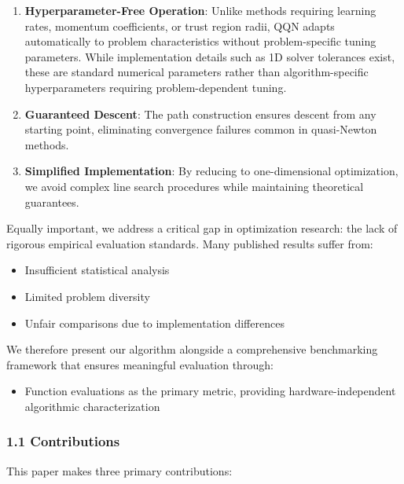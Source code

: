 \begin{enumerate}
\def\labelenumi{\arabic{enumi}.}
\item
  \textbf{Hyperparameter-Free Operation}: Unlike methods requiring learning rates, momentum coefficients, or trust region
  radii, QQN adapts automatically to problem characteristics without problem-specific tuning parameters. While
  implementation details such as 1D solver tolerances exist, these are standard numerical parameters rather than
  algorithm-specific hyperparameters requiring problem-dependent tuning.
\item
  \textbf{Guaranteed Descent}: The path construction ensures descent from any starting point, eliminating convergence
  failures common in quasi-Newton methods.
\item
  \textbf{Simplified Implementation}: By reducing to one-dimensional optimization, we avoid complex line search procedures
  while maintaining theoretical guarantees.
\end{enumerate}

Equally important, we address a critical gap in optimization research: the lack of rigorous empirical evaluation
standards. Many published results suffer from:

\begin{itemize}
\tightlist
\item
  Insufficient statistical analysis
\item
  Limited problem diversity
\item
  Unfair comparisons due to implementation differences
\end{itemize}

We therefore present our algorithm alongside a comprehensive benchmarking framework that ensures meaningful evaluation
through:

\begin{itemize}
\tightlist
\item
  Function evaluations as the primary metric, providing hardware-independent algorithmic characterization
\end{itemize}

\hypertarget{contributions}{%
\subsubsection{1.1 Contributions}\label{contributions}}

This paper makes three primary contributions:

